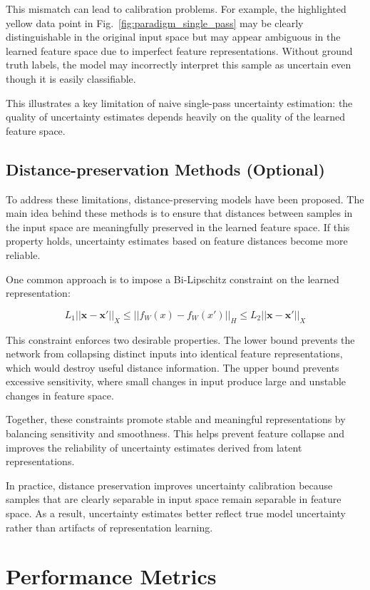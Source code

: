 \documentclass{article}
\begin{document}
This mismatch can lead to calibration problems. For example, the highlighted yellow data point in Fig.~\ref{fig:paradigm_single_pass} may be clearly distinguishable in the original input space but may appear ambiguous in the learned feature space due to imperfect feature representations. Without ground truth labels, the model may incorrectly interpret this sample as uncertain even though it is easily classifiable.

This illustrates a key limitation of naive single-pass uncertainty estimation: the quality of uncertainty estimates depends heavily on the quality of the learned feature space.

\subsection{Distance-preservation Methods (Optional)}

To address these limitations, distance-preserving models have been proposed. The main idea behind these methods is to ensure that distances between samples in the input space are meaningfully preserved in the learned feature space. If this property holds, uncertainty estimates based on feature distances become more reliable.

One common approach is to impose a Bi-Lipschitz constraint on the learned representation:

\[
L_1||\boldsymbol{x} - \boldsymbol{x'}||_X 
\leq 
||f_W(x) - f_W(x')||_H 
\leq 
L_2 ||\boldsymbol{x} - \boldsymbol{x'}||_X
\]

This constraint enforces two desirable properties. The lower bound prevents the network from collapsing distinct inputs into identical feature representations, which would destroy useful distance information. The upper bound prevents excessive sensitivity, where small changes in input produce large and unstable changes in feature space.

Together, these constraints promote stable and meaningful representations by balancing sensitivity and smoothness. This helps prevent feature collapse and improves the reliability of uncertainty estimates derived from latent representations.

In practice, distance preservation improves uncertainty calibration because samples that are clearly separable in input space remain separable in feature space. As a result, uncertainty estimates better reflect true model uncertainty rather than artifacts of representation learning.

\section{Performance Metrics}
\end{document}
